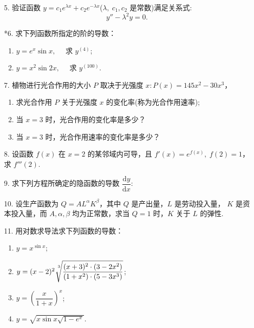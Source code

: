 \begin{enumerate}
    \item[5.] 验证函数 $y=c_1e^{\lambda x}+c_2e^{-\lambda x}$($\lambda,\;c_1,c_2$ 是常数)满足关系式:
    \[
        y''-\lambda^2y=0.
    \]

    \item[*6.] 求下列函数所指定的阶的导数：
    \begin{enumerate}[(1)]\setlength{\itemsep}{5pt}\setlength{\topsep}{15pt}
        \item $y=e^x\sin x,\quad$ 求 $y^{(4)}$;
        \item $y=x^2\sin 2x,\quad$ 求 $y^{(100)}$.
    \end{enumerate}

    \item[7.] 植物进行光合作用的大小 $P$ 取决于光强度 $x:P(x)=145x^2-30x^3$，
    \begin{enumerate}[(1)]\setlength{\itemsep}{5pt}\setlength{\topsep}{15pt}
        \item 求光合作用 $P$ 关于光强度 $x$ 的变化率(称为光合作用速率);
        \item 当 $x=3$ 时，光合作用的变化率是多少？
        \item 当 $x=3$ 时，光合作用速率的变化率是多少？
    \end{enumerate}

    \item[8.] 设函数 $f(x)$ 在 $x=2$ 的某邻域内可导，且 $f'(x)=e^{f(x)},\;f(2)=1$，求 $f'''(2)$.
    
    \item[9.] 求下列方程所确定的隐函数的导数 $\dfrac{\text{d}y}{\text{d}x}$:
    
    \item[10.] 设生产函数为 $Q=AL^{\alpha}K^{\beta}$，其中 $Q$ 是产出量，$L$ 是劳动投入量，
    $K$ 是资本投入量，而 $A,\alpha,\beta$ 均为正常数，求当 $Q=1$ 时，$K$ 关于 $L$ 的弹性.  

    \item[11.] 用对数求导法求下列函数的导数：
    \begin{enumerate}[(1)]\setlength{\itemsep}{5pt}\setlength{\topsep}{15pt}
        \item $y=x^{\sin x}$;
        \item $y=(x-2)^2\sqrt[\uproot{8}\leftroot{-2}3]{\dfrac{(x+3)^2\cdot(3-2x^2)}{(1+x^2)\cdot(5-3x^3)}}$;
        \item $y=\left(\dfrac{x}{1+x}\right)^{x}$;
        \item $y=\sqrt{x\sin x\sqrt{1-e^x}}$.
    \end{enumerate}


\end{enumerate}
